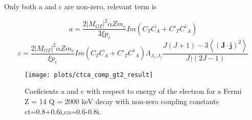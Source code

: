 \documentclass[twocolumn]{article}
\begin{document}
Only both a and c are non-zero, relevant term is

$$a = \frac{2|M_{GT}|^2 \alpha Z m_e}{3\xi p_e}Im(C_T\overline{C_A}+C'_T\overline{C'_A})$$
$$c = \frac{2|M_{GT}|^2 \alpha Z m_e}{\xi p_e}Im(C_T\overline{C_A}+C'_T\overline{C'_A}) \Lambda_{J_i,J_f}\frac{J(J+1)-3\left<(\mathbf{J}\cdot\mathbf{j})^2\right>}{J)(2J-1)}$$

\begin{figure}[H]
	\centering
	\texttt{[image: plots/ctca\_comp\_gt2\_result]}
	\caption{Coeficients a and c with respect to energy of the electron for a Fermi Z = 14 Q = 2000 keV decay  with non-zero coupling constants ct=0.8+0.6i,ca=0.6-0.8i.}
\end{figure}
\end{document}
